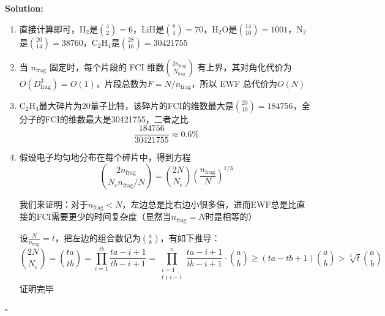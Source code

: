 \documentclass{ctexart}
\begin{document}
\medskip
\noindent\textbf{Solution:} \begin{enumerate}

\item[(a)] 直接计算即可，H$_2$是$\binom{4}{2}=6$，LiH是$\binom{8}{4}=70$，H$_2$O是$\binom{14}{10}=1001$，N$_2$是$\binom{20}{14}=38760$，C$_2$H$_4$是$\binom{28}{16}=30421755$

\item[(b)] 当 \(n_{\text{frag}}\) 固定时，每个片段的 FCI 维数$\binom{2n_{\text{frag}}}{N_{\text{frag}}}$
有上界，其对角化代价为 $O(D_{\text{frag}}^3)=O(1)$，片段总数为$F = N/n_{\text{frag}}$，所以 EWF 总代价为$O(N)$

\item[(c)] C$_2$H$_4$最大碎片为20量子比特，该碎片的FCI的维数最大是$\binom{20}{10}=184756$，全分子的FCI的维数最大是30421755，二者之比
\[
\frac{184756}{30421755}\approx 0.6\%
\]

\item[(d)] 假设电子均匀地分布在每个碎片中，得到方程
\[
\binom{2n_{\text{frag}}}{N_e n_{\text{frag}}/N}
=
\binom{2N}{N_e}
\left(\frac{n_{\text{frag}}}{N}\right)^{1/3}
\]

我们来证明：对于$n_\text{frag}<N$，左边总是比右边小很多倍，进而EWF总是比直接的FCI需要更少的时间复杂度（显然当$n_\text{frag}=N$时是相等的）

设$\frac{N}{n_\text{frag}}=t$，把左边的组合数记为$\binom{a}{b}$，有如下推导：
\[
\binom{2N}{N_e}=\binom{ta}{tb}=\prod_{i=1}^{tb}\frac{ta-i+1}{tb-i+1}=\prod_{\substack{i=1\\t\nmid i-1}}^{n}\frac{ta-i+1}{tb-i+1}\cdot\binom{a}{b}\geq(ta-tb+1)\binom{a}{b}>\sqrt[3]{t}\binom{a}{b}
\]
证明完毕

\end{enumerate}

\hfill \(\square\)
\end{document}
